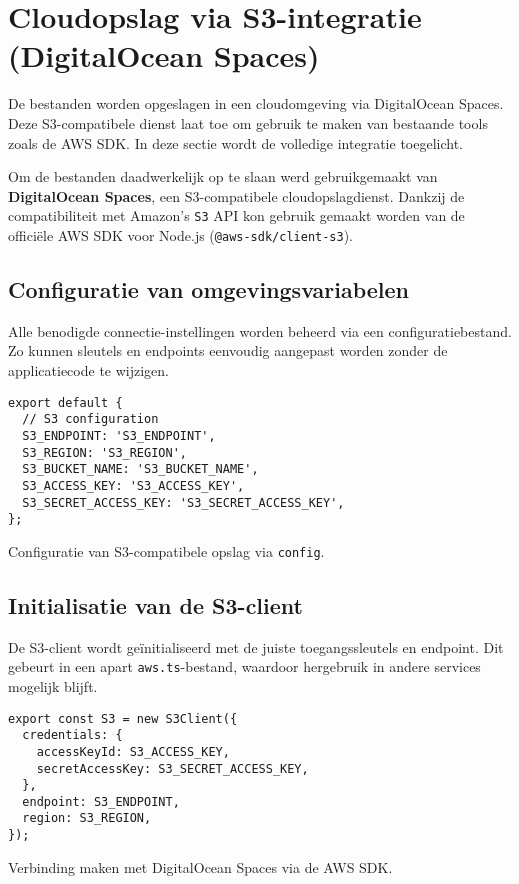 \section{Cloudopslag via S3-integratie (DigitalOcean Spaces)}
\label{sec:s3-integratie}

De bestanden worden opgeslagen in een cloudomgeving via DigitalOcean Spaces. Deze S3-compatibele dienst laat toe om gebruik te maken van bestaande tools zoals de AWS SDK. In deze sectie wordt de volledige integratie toegelicht.

Om de bestanden daadwerkelijk op te slaan werd gebruikgemaakt van \textbf{DigitalOcean Spaces}, een S3-compatibele cloudopslagdienst. Dankzij de compatibiliteit met Amazon's \texttt{S3} API kon gebruik gemaakt worden van de officiële AWS SDK voor Node.js (\texttt{@aws-sdk/client-s3}).

\subsection{Configuratie van omgevingsvariabelen}

Alle benodigde connectie-instellingen worden beheerd via een configuratiebestand. Zo kunnen sleutels en endpoints eenvoudig aangepast worden zonder de applicatiecode te wijzigen.

\begin{listing}[H]
\begin{verbatim}
export default {
  // S3 configuration
  S3_ENDPOINT: 'S3_ENDPOINT',
  S3_REGION: 'S3_REGION',
  S3_BUCKET_NAME: 'S3_BUCKET_NAME',
  S3_ACCESS_KEY: 'S3_ACCESS_KEY',
  S3_SECRET_ACCESS_KEY: 'S3_SECRET_ACCESS_KEY',
};
\end{verbatim}
\caption[Omgevingsvariabelen voor S3]{Configuratie van S3-compatibele opslag via \texttt{config}.}
\end{listing}

\subsection{Initialisatie van de S3-client}

De S3-client wordt geïnitialiseerd met de juiste toegangssleutels en endpoint. Dit gebeurt in een apart \texttt{aws.ts}-bestand, waardoor hergebruik in andere services mogelijk blijft.

\begin{listing}[H]
\begin{verbatim}
export const S3 = new S3Client({
  credentials: {
    accessKeyId: S3_ACCESS_KEY,
    secretAccessKey: S3_SECRET_ACCESS_KEY,
  },
  endpoint: S3_ENDPOINT,
  region: S3_REGION,
});
\end{verbatim}
\caption[Initialisatie van de S3-client]{Verbinding maken met DigitalOcean Spaces via de AWS SDK.}
\end{listing}

